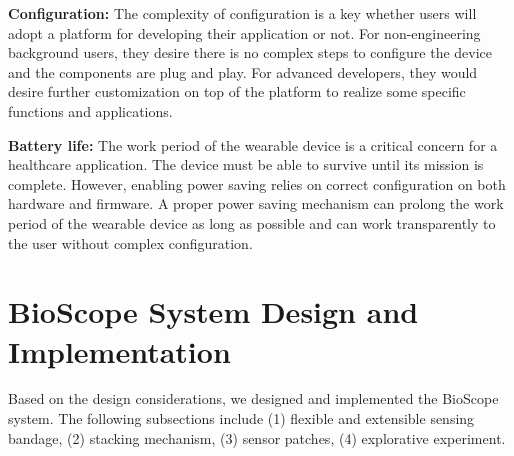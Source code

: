 \vspace{10pt}
\textbf{Configuration:}
\newline
The complexity of configuration is a key whether users will adopt a platform for developing their application or not. For non-engineering background users, they desire there is no complex steps to configure the device and the components are plug and play. For advanced developers, they would desire further customization on top of the platform to realize some specific functions and applications. 

\vspace{10pt}
\textbf{Battery life:}
\newline
The work period of the wearable device is a critical concern for a healthcare application. The device must be able to survive until its mission is complete. However, enabling power saving relies on correct configuration on both hardware and firmware. A proper power saving mechanism can prolong the work period of the wearable device as long as possible and can work transparently to the user without complex configuration.




\section{BioScope System Design and Implementation}
Based on the design considerations, we designed and implemented the BioScope system. The following subsections include (1) flexible and extensible sensing bandage, (2) stacking mechanism, (3) sensor patches, (4) explorative experiment.


